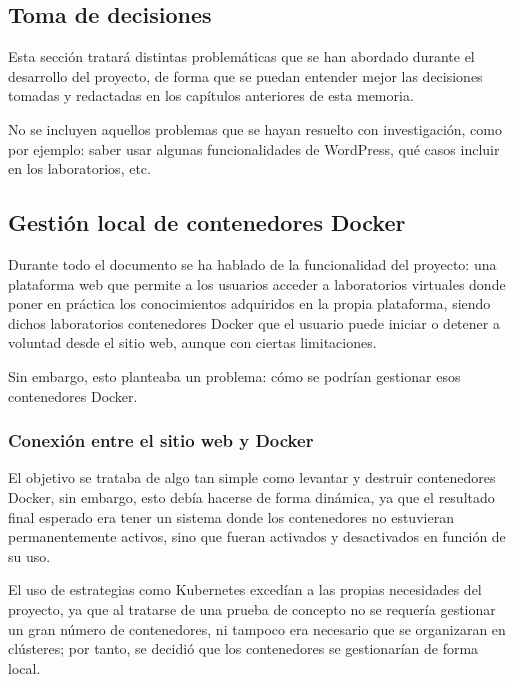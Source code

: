         \cleardoublepage



\begin{appendices}

    \chapter{Toma de decisiones}

        Esta sección tratará distintas problemáticas que se han abordado durante el desarrollo del proyecto, de forma que se puedan entender mejor las decisiones tomadas y redactadas en los capítulos anteriores de esta memoria.

        No se incluyen aquellos problemas que se hayan resuelto con investigación, como por ejemplo: saber usar algunas funcionalidades de WordPress, qué casos incluir en los laboratorios, etc.

    \section{Gestión local de contenedores Docker}

        Durante todo el documento se ha hablado de la funcionalidad del proyecto: una plataforma web que permite a los usuarios acceder a laboratorios virtuales donde poner en práctica los conocimientos adquiridos en la propia plataforma, siendo dichos laboratorios contenedores Docker que el usuario puede iniciar o detener a voluntad desde el sitio web, aunque con ciertas limitaciones.
        
        Sin embargo, esto planteaba un problema: cómo se podrían gestionar esos contenedores Docker. 

        \subsection{Conexión entre el sitio web y Docker}

            El objetivo se trataba de algo tan simple como levantar y destruir contenedores Docker, sin embargo, esto debía hacerse de forma dinámica, ya que el resultado final esperado era tener un sistema donde los contenedores no estuvieran permanentemente activos, sino que fueran activados y desactivados en función de su uso.
            
            El uso de estrategias como Kubernetes excedían a las propias necesidades del proyecto, ya que al tratarse de una prueba de concepto no se requería gestionar un gran número de contenedores, ni tampoco era necesario que se organizaran en clústeres; por tanto, se decidió que los contenedores se gestionarían de forma local.


\end{appendices}
